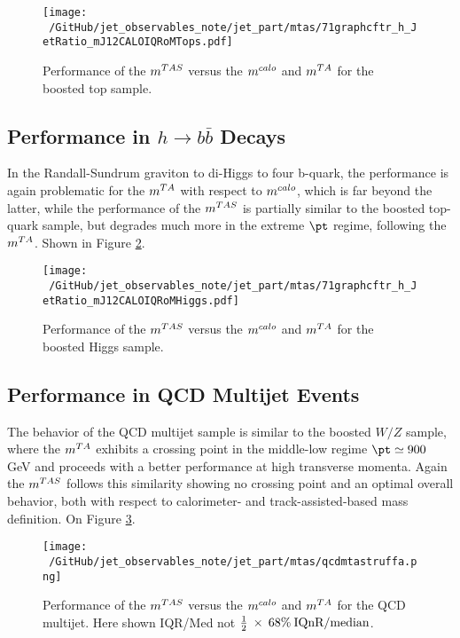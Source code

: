\begin{figure}[!ht]
  \centering
      \texttt{[image: ~/GitHub/jet\_observables\_note/jet\_part/mtas/71graphcftr\_h\_JetRatio\_mJ12CALOIQRoMTops.pdf]}
  \caption[$\mtas$ for boosted tops]{Performance of the $\mtas$ versus the $m^{calo}$ and $m^{TA}$ for the boosted top sample.}
  \label{fig:mtas3}
\end{figure}
\subsection{Performance in $h\to b\bar{b}$ Decays}
In the Randall-Sundrum graviton to di-Higgs to four b-quark, the performance is again problematic for the $m^{TA}$ with respect to $m^{calo}$, which is far beyond the latter, while the performance of the $\mtas$ is partially similar to the boosted top-quark sample, but degrades much more in the extreme $\pt$ regime, following the $m^{TA}$. Shown in Figure \ref{fig:mtas4}.

\begin{figure}[!ht]
  \centering
      \texttt{[image: ~/GitHub/jet\_observables\_note/jet\_part/mtas/71graphcftr\_h\_JetRatio\_mJ12CALOIQRoMHiggs.pdf]}
  \caption[$\mtas$ for boosted Higgs]{Performance of the $\mtas$ versus the $m^{calo}$ and $m^{TA}$ for the boosted Higgs sample.}
  \label{fig:mtas4}
\end{figure}

\subsection{Performance in QCD Multijet Events}
The behavior of the QCD multijet sample is similar to the boosted $W/Z$ sample, where the $m^{TA}$ exhibits a crossing point in the middle-low regime $\pt\simeq900$ GeV and proceeds with a better performance at high transverse momenta.
Again the $\mtas$ follows this similarity showing no crossing point and an optimal overall behavior, both with respect to calorimeter- and track-assisted-based mass definition. On Figure \ref{fig:mtas5}.

\begin{figure}[!ht]
  \centering
        \texttt{[image: ~/GitHub/jet\_observables\_note/jet\_part/mtas/qcdmtastruffa.png]}
   \caption[$\mtas$ for QCD jets]{Performance of the $\mtas$ versus the $m^{calo}$ and $m^{TA}$ for the QCD multijet. Here shown IQR/Med not $\frac{1}{2}\: \times\: 68\% \:\textrm{IQnR/median}$.}
  \label{fig:mtas5}
\end{figure}

